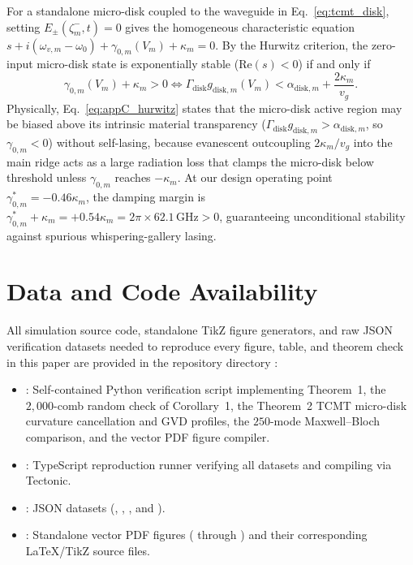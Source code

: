 \documentclass[11pt,letterpaper]{article}
\begin{document}
For a standalone micro-disk coupled to the waveguide in Eq.~\eqref{eq:tcmt_disk}, setting $E_\pm(\zeta_m^-, t) = 0$ gives the homogeneous characteristic equation $s + i(\omega_{v,m} - \omega_0) + \gamma_{0,m}(V_m) + \kappa_m = 0$. By the Hurwitz criterion, the zero-input micro-disk state is exponentially stable ($\mathrm{Re}(s) < 0$) if and only if
\begin{equation}
\gamma_{0,m}(V_m) + \kappa_m > 0 \iff \Gamma_{\mathrm{disk}} g_{\mathrm{disk},m}(V_m) < \alpha_{\mathrm{disk},m} + \frac{2\kappa_m}{v_g}.
\label{eq:appC_hurwitz}
\end{equation}
Physically, Eq.~\eqref{eq:appC_hurwitz} states that the micro-disk active region may be biased above its intrinsic material transparency ($\Gamma_{\mathrm{disk}} g_{\mathrm{disk},m} > \alpha_{\mathrm{disk},m}$, so $\gamma_{0,m} < 0$) without self-lasing, because evanescent outcoupling $2\kappa_m/v_g$ into the main ridge acts as a large radiation loss that clamps the micro-disk below threshold unless $\gamma_{0,m}$ reaches $-\kappa_m$. At our design operating point $\gamma_{0,m}^* = -0.46\kappa_m$, the damping margin is $\gamma_{0,m}^* + \kappa_m = +0.54\kappa_m = 2\pi \times 62.1\,\mathrm{GHz} > 0$, guaranteeing unconditional stability against spurious whispering-gallery lasing.

\section*{Data and Code Availability}

{\sloppy
All simulation source code, standalone TikZ figure generators, and raw JSON verification datasets needed to reproduce every figure, table, and theorem check in this paper are provided in the repository directory :
\begin{itemize}
    \item {}: Self-contained Python verification script implementing Theorem~1, the $2{,}000$-comb random check of Corollary~1, the Theorem~2 TCMT micro-disk curvature cancellation and GVD profiles, the $250$-mode Maxwell--Bloch comparison, and the vector PDF figure compiler.
    \item {}: TypeScript reproduction runner verifying all datasets and compiling  via Tectonic.
    \item {}: JSON datasets (, , , and ).
    \item {}: Standalone vector PDF figures ( through ) and their corresponding LaTeX/TikZ source files.
\end{itemize}
\par}
\end{document}
